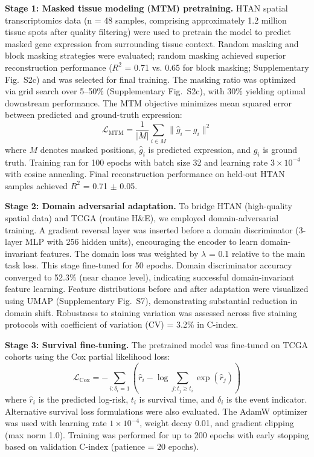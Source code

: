 \documentclass[pdflatex,sn-nature]{sn-jnl}%
\theoremstyle{thmstyleone}%
\theoremstyle{thmstyletwo}%
\theoremstyle{thmstylethree}%
\begin{document}
\textbf{Stage 1: Masked tissue modeling (MTM) pretraining.} HTAN spatial transcriptomics data (n = 48 samples, comprising approximately 1.2 million tissue spots after quality filtering) were used to pretrain the model to predict masked gene expression from surrounding tissue context. Random masking and block masking strategies were evaluated; random masking achieved superior reconstruction performance ($R^2$ = 0.71 vs. 0.65 for block masking; Supplementary Fig.~S2c) and was selected for final training. The masking ratio was optimized via grid search over 5--50\% (Supplementary Fig.~S2c), with 30\% yielding optimal downstream performance. The MTM objective minimizes mean squared error between predicted and ground-truth expression:
\begin{equation}
\mathcal{L}_{\text{MTM}} = \frac{1}{|M|} \sum_{i \in M} \| \hat{g}_i - g_i \|^2
\end{equation}
where $M$ denotes masked positions, $\hat{g}_i$ is predicted expression, and $g_i$ is ground truth. Training ran for 100 epochs with batch size 32 and learning rate $3 \times 10^{-4}$ with cosine annealing. Final reconstruction performance on held-out HTAN samples achieved $R^2$ = 0.71 $\pm$ 0.05.

\textbf{Stage 2: Domain adversarial adaptation.} To bridge HTAN (high-quality spatial data) and TCGA (routine H\&E), we employed domain-adversarial training\cite{bib15}. A gradient reversal layer was inserted before a domain discriminator (3-layer MLP with 256 hidden units), encouraging the encoder to learn domain-invariant features. The domain loss was weighted by $\lambda$ = 0.1 relative to the main task loss. This stage fine-tuned for 50 epochs. Domain discriminator accuracy converged to 52.3\% (near chance level), indicating successful domain-invariant feature learning. Feature distributions before and after adaptation were visualized using UMAP (Supplementary Fig.~S7), demonstrating substantial reduction in domain shift. Robustness to staining variation was assessed across five staining protocols with coefficient of variation (CV) = 3.2\% in C-index.

\textbf{Stage 3: Survival fine-tuning.} The pretrained model was fine-tuned on TCGA cohorts using the Cox partial likelihood loss\cite{bib12,bib58}:
\begin{equation}
\mathcal{L}_{\text{Cox}} = -\sum_{i: \delta_i = 1} \left( \hat{r}_i - \log \sum_{j: t_j \geq t_i} \exp(\hat{r}_j) \right)
\end{equation}
where $\hat{r}_i$ is the predicted log-risk, $t_i$ is survival time, and $\delta_i$ is the event indicator. Alternative survival loss formulations\cite{bib59} were also evaluated. The AdamW optimizer\cite{bib33} was used with learning rate $1 \times 10^{-4}$, weight decay 0.01, and gradient clipping (max norm 1.0). Training was performed for up to 200 epochs with early stopping based on validation C-index (patience = 20 epochs).
\end{document}
